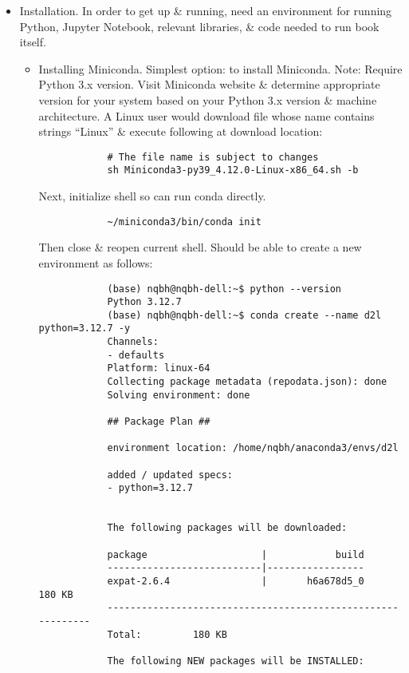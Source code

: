 \documentclass{article}
\begin{document}
\begin{itemize}
\begin{itemize}
\begin{itemize}
		\end{itemize}
	\end{itemize}
	\item {\sf Installation.} In order to get up \& running, need an environment for running Python, Jupyter Notebook, relevant libraries, \& code needed to run book itself.
	\begin{itemize}
		\item {\sf Installing Miniconda.} Simplest option: to install Miniconda. Note: Require Python 3.x version. Visit Miniconda website \& determine appropriate version for your system based on your Python 3.x version \& machine architecture. A Linux user would download file whose name contains strings ``Linux'' \& execute following at download location:
		\begin{verbatim}
			# The file name is subject to changes
			sh Miniconda3-py39_4.12.0-Linux-x86_64.sh -b
		\end{verbatim}
		Next, initialize shell so can run conda directly.
		\begin{verbatim}
			~/miniconda3/bin/conda init
		\end{verbatim}
		Then close \& reopen current shell. Should be able to create a new environment as follows:
		\begin{verbatim}
			(base) nqbh@nqbh-dell:~$ python --version
			Python 3.12.7
			(base) nqbh@nqbh-dell:~$ conda create --name d2l python=3.12.7 -y
			Channels:
			- defaults
			Platform: linux-64
			Collecting package metadata (repodata.json): done
			Solving environment: done

			## Package Plan ##

			environment location: /home/nqbh/anaconda3/envs/d2l

			added / updated specs:
			- python=3.12.7


			The following packages will be downloaded:

			package                    |            build
			---------------------------|-----------------
			expat-2.6.4                |       h6a678d5_0         180 KB
			------------------------------------------------------------
			Total:         180 KB

			The following NEW packages will be INSTALLED:


\end{verbatim}
\end{itemize}
\end{itemize}
\end{document}
